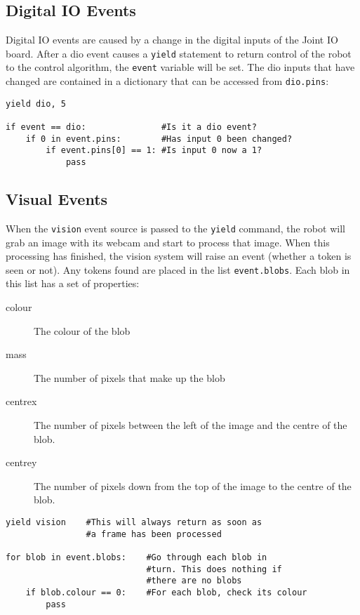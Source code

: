 \documentclass{article}
\begin{document}
\subsection{Digital IO Events}
Digital IO events are caused by a change in the digital inputs of the
Joint IO board. After a dio event causes a \texttt{yield} statement to
return control of the robot to the control algorithm, the
\texttt{event} variable will be set. The dio inputs that have changed
are contained in a dictionary that can be accessed from \texttt{dio.pins}: 

\begin{verbatim}
yield dio, 5

if event == dio:               #Is it a dio event?
    if 0 in event.pins:        #Has input 0 been changed?
        if event.pins[0] == 1: #Is input 0 now a 1?
            pass
\end{verbatim}

\subsection{Visual Events}
When the \texttt{vision} event source is passed to the \texttt{yield}
command, the robot will grab an image with its webcam and start to
process that image.  When this processing has finished, the vision
system will raise an event (whether a token is seen or not).  Any
tokens found are placed in the list \texttt{event.blobs}.  Each blob in this
list has a set of properties:  
\begin{description}
\item[colour] The colour of the blob
\item[mass] The number of pixels that make up the blob
\item[centrex] The number of pixels between the left of the image and
  the centre of the blob.
\item[centrey] The number of pixels down from the top of the image to the
  centre of the blob.
\end{description}

\begin{verbatim}
yield vision    #This will always return as soon as
                #a frame has been processed

for blob in event.blobs:    #Go through each blob in 
                            #turn. This does nothing if
                            #there are no blobs
    if blob.colour == 0:    #For each blob, check its colour
        pass
\end{verbatim}
\end{document}
